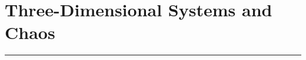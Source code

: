 \section{Three-Dimensional Systems and Chaos}
\noindent\rule[\linienAbstand]{\linewidth}{\linienDickeDick}
